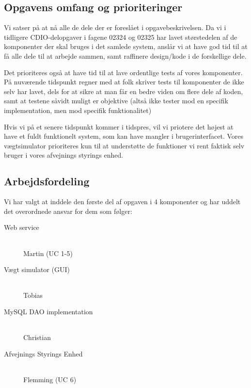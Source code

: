 \documentclass[a4paper]{article}
\begin{document}

\subsection{Opgavens omfang og prioriteringer} %
\label{sub:Opgavens omfang og prioriteringer}

Vi satser på at nå alle de dele der er foreslået i opgavebeskrivelsen. Da vi i tidligere CDIO-delopgaver i fagene 02324 og 02325 har lavet størstedelen af de komponenter der skal bruges i det samlede system, anslår vi at have god tid til at få alle dele til at arbejde sammen, samt raffinere design/kode i de forskellige dele.

Det prioriteres også at have tid til at lave ordentlige tests af vores komponenter. På nuværende tidspunkt regner med at folk skriver tests til komponenter de ikke selv har lavet, dels for at sikre at man får en bedre viden om flere dele af koden, samt at testene såvidt muligt er objektive (altså ikke tester mod en specifik implementation, men mod specifik funktionalitet)

Hvis vi på et senere tidspunkt kommer i tidspres, vil vi priotere det højest at have et fuldt funktionelt system, som kan have mangler i brugerinterfacet. Vores vægtsimulator prioriteres kun til at understøtte de funktioner vi rent faktisk selv bruger i vores afvejnings styrings enhed.


\subsection{Arbejdsfordeling} %
\label{sub:Arbejdsfordeling}

Vi har valgt at inddele den første del af opgaven i 4 komponenter og har uddelt det overordnede ansvar for dem som følger:

\begin{description}
  \item[Web service]\hfill
    \\Martin (UC 1-5)
  \item[Vægt simulator (GUI)]\hfill
    \\Tobias
  \item[MySQL DAO implementation]\hfill
    \\Christian
  \item[Afvejnings Styrings Enhed]\hfill
    \\Flemming (UC 6)
\end{description}
\end{document}
